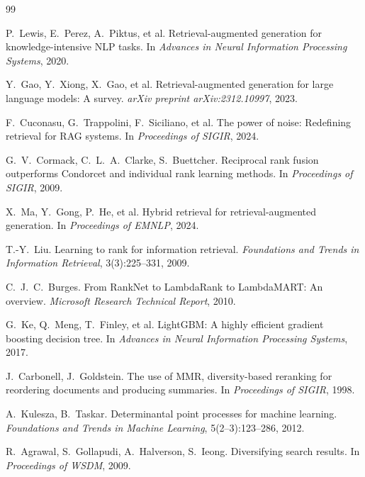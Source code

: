 \documentclass[10pt,a4paper]{article}
\begin{document}
\begin{thebibliography}{99}

P.~Lewis, E.~Perez, A.~Piktus, et al.
\newblock Retrieval-augmented generation for knowledge-intensive NLP tasks.
\newblock In \emph{Advances in Neural Information Processing Systems}, 2020.

Y.~Gao, Y.~Xiong, X.~Gao, et al.
\newblock Retrieval-augmented generation for large language models: A survey.
\newblock \emph{arXiv preprint arXiv:2312.10997}, 2023.

F.~Cuconasu, G.~Trappolini, F.~Siciliano, et al.
\newblock The power of noise: Redefining retrieval for RAG systems.
\newblock In \emph{Proceedings of SIGIR}, 2024.

G.~V.~Cormack, C.~L.~A.~Clarke, S.~Buettcher.
\newblock Reciprocal rank fusion outperforms Condorcet and individual rank learning methods.
\newblock In \emph{Proceedings of SIGIR}, 2009.

X.~Ma, Y.~Gong, P.~He, et al.
\newblock Hybrid retrieval for retrieval-augmented generation.
\newblock In \emph{Proceedings of EMNLP}, 2024.

T.-Y.~Liu.
\newblock Learning to rank for information retrieval.
\newblock \emph{Foundations and Trends in Information Retrieval}, 3(3):225--331, 2009.

C.~J.~C.~Burges.
\newblock From RankNet to LambdaRank to LambdaMART: An overview.
\newblock \emph{Microsoft Research Technical Report}, 2010.

G.~Ke, Q.~Meng, T.~Finley, et al.
\newblock LightGBM: A highly efficient gradient boosting decision tree.
\newblock In \emph{Advances in Neural Information Processing Systems}, 2017.

J.~Carbonell, J.~Goldstein.
\newblock The use of MMR, diversity-based reranking for reordering documents and producing summaries.
\newblock In \emph{Proceedings of SIGIR}, 1998.

A.~Kulesza, B.~Taskar.
\newblock Determinantal point processes for machine learning.
\newblock \emph{Foundations and Trends in Machine Learning}, 5(2--3):123--286, 2012.

R.~Agrawal, S.~Gollapudi, A.~Halverson, S.~Ieong.
\newblock Diversifying search results.
\newblock In \emph{Proceedings of WSDM}, 2009.


\end{thebibliography}
\end{document}
